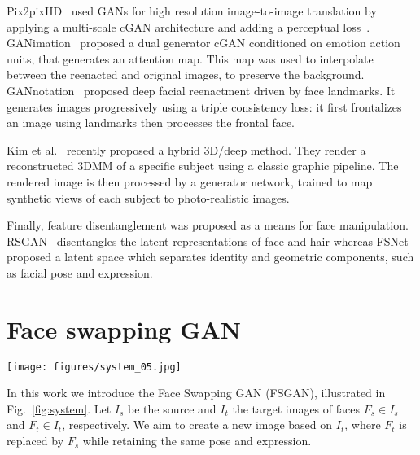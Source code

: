  Pix2pixHD~\cite{wang2018pix2pixHD} used GANs for high resolution image-to-image translation by applying a multi-scale cGAN architecture and adding a perceptual loss~\cite{johnson2016perceptual}. GANimation~\cite{pumarola2018ganimation} proposed a dual generator cGAN conditioned on emotion action units, that generates an attention map. This map was used to interpolate between the reenacted and original images, to preserve the background. GANnotation~\cite{sanchez2018triple} proposed deep facial reenactment driven by face landmarks. It generates images progressively using a triple consistency loss: it first frontalizes an image using landmarks then processes the frontal face. 

Kim et al.~\cite{kim2018deep} recently proposed a hybrid 3D/deep method. They render a reconstructed 3DMM of a specific subject using a classic graphic pipeline. The rendered image is then processed by a generator network, trained to map synthetic views of each subject to photo-realistic images.

Finally, feature disentanglement was proposed as a means for face manipulation. RSGAN~\cite{natsume2018rsgan} disentangles the latent representations of face and hair whereas FSNet~\cite{natsume18fsnet} proposed a latent space which separates identity and geometric components, such as facial pose and expression.

\section{Face swapping GAN}\label{sec:FSGAN}

\begin{figure*}[!htbp]
\centering
\texttt{[image: figures/system\_05.jpg]}
\caption{Overview of the proposed FSGAN approach. (a) The recurrent reenactment generator $G_{r}$ and the segmentation generator $G_{s}$. $G_{r}$ estimates the reenacted face $F_{r}$ and its segmentation $S_r$, while $G_{s}$ estimates the face and hair segmentation mask $S_{t}$ of the target image $I_{t}$. (b) The inpainting generator $G_{c}$ inpaints the missing parts of $\tilde{F}_{r}$ based on $S_{t}$ to estimate the complete reenacted face $F_{c}$. (c) The blending generator $G_{b}$ blends $F_{c}$ and $F_{t}$, using the segmentation mask $S_{t}$.\vspace{-3mm}}\label{fig:system}
\end{figure*}

In this work we introduce the Face Swapping GAN (FSGAN), illustrated in Fig.~\ref{fig:system}. Let $I_{s}$ be the source and $I_{t}$ the target images of faces $F_{s}\in I_{s}$ and $F_{t}\in I_{t}$, respectively. We aim to create a new image based on $I_{t}$, where $F_{t}$ is replaced by $F_{s}$ while retaining the same pose and expression. 

